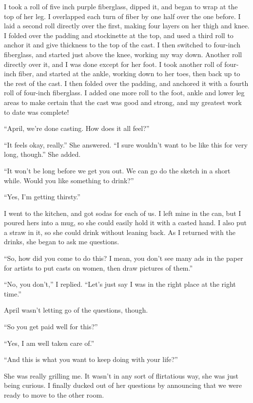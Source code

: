 I took a roll of five inch purple fiberglass, dipped it, and began to wrap at the top of her
leg. I overlapped each turn of fiber by one half over the one before. I laid a second roll
directly over the first, making four layers on her thigh and knee. I folded over the padding and
stockinette at the top, and used a third roll to anchor it and give thickness to the top of the
cast. I then switched to four-inch fiberglass, and started just above the knee, working my way
down. Another roll directly over it, and I was done except for her foot. I took another roll of
four-inch fiber, and started at the ankle, working down to her toes, then back up to the rest of
the cast. I then folded over the padding, and anchored it with a fourth roll of four-inch
fiberglass. I added one more roll to the foot, ankle and lower leg areas to make certain that
the cast was good and strong, and my greatest work to date was complete!

``April, we're done casting. How does it all feel?''

``It feels okay, really.'' She answered. ``I sure wouldn't want to be like this for very long,
though.'' She added.

``It won't be long before we get you out. We can go do the sketch in a short while. Would you
like something to drink?''

``Yes, I'm getting thirsty.''

I went to the kitchen, and got sodas for each of us. I left mine in the can, but I poured hers
into a mug, so she could easily hold it with a casted hand. I also put a straw in it, so she
could drink without leaning back. As I returned with the drinks, she began to ask me questions.

``So, how did you come to do this? I mean, you don't see many ads in the paper for artists to
put casts on women, then draw pictures of them.''

``No, you don't,'' I replied. ``Let's just say I was in the right place at the right time.''

April wasn't letting go of the questions, though.

``So you get paid well for this?''

``Yes, I am well taken care of.''

``And this is what you want to keep doing with your life?''

She was really grilling me. It wasn't in any sort of flirtatious way, she was just being
curious. I finally ducked out of her questions by announcing that we were ready to move to the
other room.

